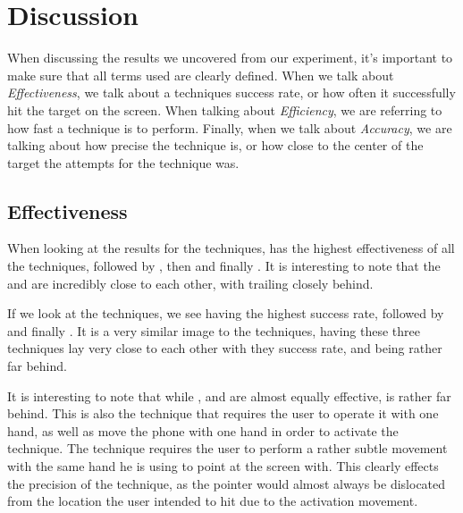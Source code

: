 \section{Discussion}\label{sec:discussion}
When discussing the results we uncovered from our experiment, it's important to make sure that all terms used are clearly defined. When we talk about \emph{Effectiveness}, we talk about a techniques success rate, or how often it successfully hit the target on the screen. When talking about \emph{Efficiency}, we are referring to how fast a technique is to perform. Finally, when we talk about \emph{Accuracy}, we are talking about how precise the technique is, or how close to the center of the target the attempts for the technique was. 

\subsection{Effectiveness}

When looking at the results for the \push techniques, \grab has the highest effectiveness of all the techniques, followed by \swipe, then \throw and finally \tilt. It is interesting to note that the \grab and \swipe are incredibly close to each other, with \throw trailing closely behind. 

If we look at the \pull techniques, we see \swipe having the highest success rate, followed by \throw and finally \grab. It is a very similar image to the \push techniques, having these three techniques lay very close to each other with they success rate, and \tilt being rather far behind.  

It is interesting to note that while \grab, \swipe and \throw are almost equally effective, \tilt is rather far behind. This is also the technique that requires the user to operate it with one hand, as well as move the phone with one hand in order to activate the technique. The technique requires the user to perform a rather subtle movement with the same hand he is using to point at the screen with. This clearly effects the precision of the technique, as the pointer would almost always be dislocated from the location the user intended to hit due to the activation movement.